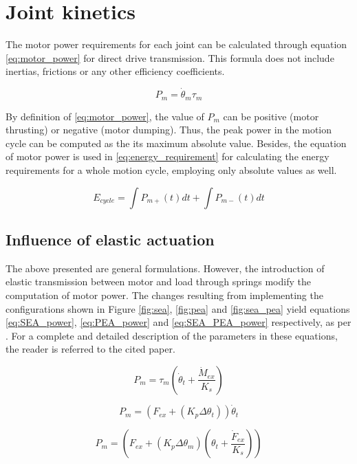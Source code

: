 
\section{Joint kinetics} %
\label{sec:joint_kinetics}
The motor power requirements for each joint can be calculated through equation \ref{eq:motor_power} for direct drive transmission.
This formula does not include inertias, frictions or any other efficiency coefficients. 

\begin{equation}
\label{eq:motor_power}
	P_{m} = \dot{\theta}_{m} \tau_{m}
\end{equation}

By definition of \ref{eq:motor_power}, the value of $P_{m}$ can be positive (motor thrusting) or negative (motor dumping).
Thus, the peak power in the motion cycle can be computed as the its maximum absolute value.
Besides, the equation of motor power is used in \ref{eq:energy_requirement} for calculating the energy requirements for a whole motion cycle, employing only absolute values as well.

\begin{equation}
\label{eq:energy_requirement}
 	E_{cycle} = \int{P_{m+}(t) dt} + \int{P_{m-}(t) dt}
 \end{equation} 

\subsection{Influence of elastic actuation} %
\label{sub:influence_of_elastic_actuation}
The above presented are general formulations.
However, the introduction of elastic transmission between motor and load through springs modify the computation of motor power.
The changes resulting from implementing the configurations shown in Figure \ref{fig:sea}, \ref{fig:pea} and \ref{fig:sea_pea} yield equations \ref{eq:SEA_power}, \ref{eq:PEA_power} and \ref{eq:SEA_PEA_power} respectively, as per \cite{grimmer}.
For a complete and detailed description of the parameters in these equations, the reader is referred to the cited paper.

\begin{equation}
\label{eq:SEA_power}
	P_{m} = \tau_{m} \left(\dot{\theta}_{t} + \frac{\dot{M}_{ex}}{K_{s}}\right)
\end{equation}

\begin{equation}
\label{eq:PEA_power}
	P_{m} = (F_{ex} + (K_{p} \Delta \theta_{t})) \dot{\theta}_{t}
\end{equation}

\begin{equation}
\label{eq:SEA_PEA_power}
	P_{m} = \left(F_{ex} + (K_{p} \Delta \theta_{m}) \left(\theta_{t} + \frac{\dot{F}_{ex}}{K_{s}}\right)\right)
\end{equation}


